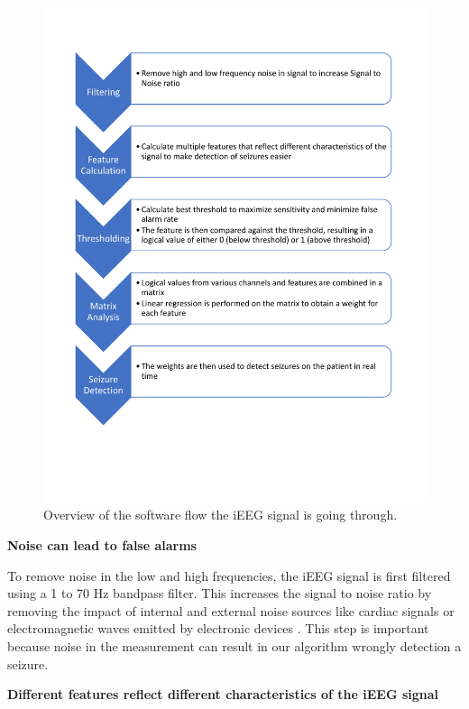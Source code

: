 \documentclass[usletter, 11pt]{extarticle}
\begin{document}
\begin{figure}[p]
	\centering
	\includegraphics[width = \textwidth]{img/SoftwareDiagram}
	\caption{Overview of the software flow the iEEG signal is going through.}
	\label{fig:software_diagram}
\end{figure}

\vspace{11pt}
\textbf{Noise can lead to false alarms}

To remove noise in the low and high frequencies, the iEEG signal is first filtered using a 1 to 70 Hz bandpass filter. This increases the signal to noise ratio by removing the impact of internal and external noise sources like cardiac signals or electromagnetic waves emitted by electronic devices \cite{repovs2010}. This step is important because noise in the measurement can result in our algorithm wrongly detection a seizure. 

\vspace{11pt}
\textbf{Different features reflect different characteristics of the iEEG signal}
\end{document}
